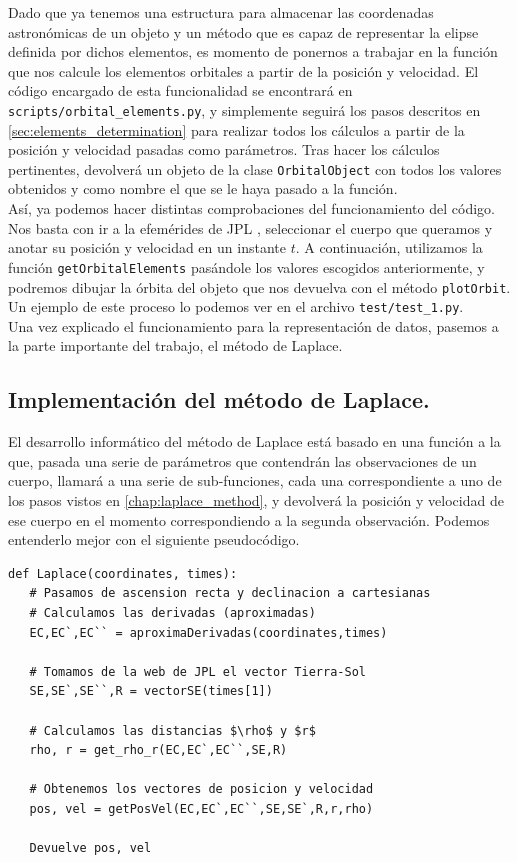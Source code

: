\documentclass[11pt]{book}
\begin{document}
Dado que ya tenemos una estructura para almacenar las coordenadas astronómicas de un objeto y un método que es capaz de representar la elipse definida por dichos elementos, es momento de ponernos a trabajar en la función que nos calcule los elementos orbitales a partir de la posición y velocidad. El código encargado de esta funcionalidad se encontrará en \texttt{scripts/orbital\_elements.py}, y simplemente seguirá los pasos descritos en \ref{sec:elements_determination} para realizar todos los cálculos a partir de la posición y velocidad pasadas como parámetros. Tras hacer los cálculos pertinentes, devolverá un objeto de la clase \texttt{OrbitalObject} con todos los valores obtenidos y como nombre el que se le haya pasado a la función.\\

Así, ya podemos hacer distintas comprobaciones del funcionamiento del código. Nos basta con ir a la efemérides de JPL \cite{jpl}, seleccionar el cuerpo que queramos y anotar su posición y velocidad en un instante $t$. A continuación, utilizamos la función \texttt{getOrbitalElements} pasándole los valores escogidos anteriormente, y podremos dibujar la órbita del objeto que nos devuelva con el método \texttt{plotOrbit}. Un ejemplo de este proceso lo podemos ver en el archivo \texttt{test/test\_1.py}.\\

Una vez explicado el funcionamiento para la representación de datos, pasemos a la parte importante del trabajo, el método de Laplace.\\

\subsection{Implementación del método de Laplace.}
\label{subsec:laplace_method_code}
El desarrollo informático del método de Laplace está basado en una función a la que, pasada una serie de parámetros que contendrán las observaciones de un cuerpo, llamará a una serie de sub-funciones, cada una correspondiente a uno de los pasos vistos en \ref{chap:laplace_method}, y devolverá la posición y velocidad de ese cuerpo en el momento correspondiendo a la segunda observación. Podemos entenderlo mejor con el siguiente pseudocódigo.
\begin{lstlisting}[style=PythonCode]
def Laplace(coordinates, times):
   # Pasamos de ascension recta y declinacion a cartesianas
   # Calculamos las derivadas (aproximadas)
   EC,EC`,EC`` = aproximaDerivadas(coordinates,times)
   
   # Tomamos de la web de JPL el vector Tierra-Sol
   SE,SE`,SE``,R = vectorSE(times[1])
   
   # Calculamos las distancias $\rho$ y $r$
   rho, r = get_rho_r(EC,EC`,EC``,SE,R)
   
   # Obtenemos los vectores de posicion y velocidad
   pos, vel = getPosVel(EC,EC`,EC``,SE,SE`,R,r,rho)
   
   Devuelve pos, vel
\end{lstlisting}
\end{document}

